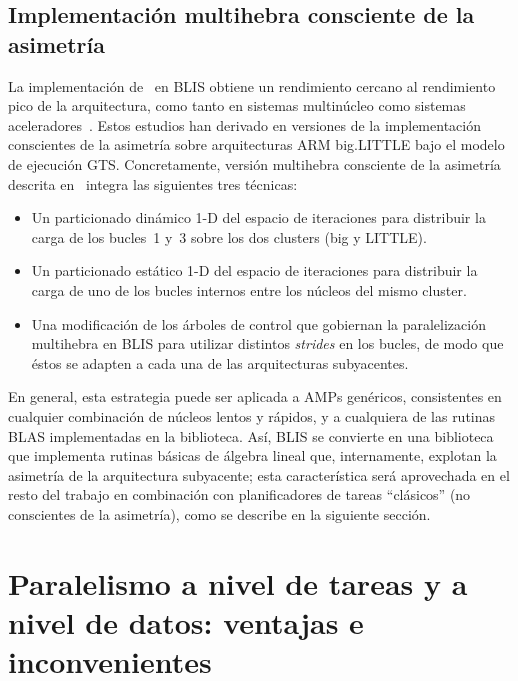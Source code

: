 

\subsection{Implementación multihebra consciente de la asimetría}

La implementación de \gemm\ en BLIS obtiene un rendimiento cercano al rendimiento pico de la arquitectura,
como tanto en sistemas multinúcleo como sistemas aceleradores~\cite{BLIS2,BLIS3}. 
Estos estudios han derivado en versiones de la implementación conscientes de la asimetría sobre arquitecturas ARM big.LITTLE
bajo el modelo de ejecución GTS. Concretamente, versión multihebra consciente de la asimetría descrita en~\cite{asymBLIS} 
integra las siguientes tres técnicas:
\begin{itemize}
\item Un particionado dinámico 1-D del espacio de iteraciones para distribuir la carga de los bucles~1 y~3 sobre los dos
	clusters (big y LITTLE).
\item Un particionado estático 1-D del espacio de iteraciones para distribuir la carga de uno de los  bucles internos entre los núcleos
	del mismo cluster.
\item Una modificación de los árboles de control que gobiernan la paralelización multihebra en BLIS para utilizar distintos {\em strides} en 
	los bucles, de modo que éstos se adapten a cada una de las arquitecturas subyacentes.
\end{itemize}

En general, esta estrategia puede ser aplicada a AMPs genéricos, consistentes en cualquier combinación de núcleos lentos y rápidos, y a cualquiera
de las rutinas BLAS implementadas en la biblioteca. Así, BLIS se convierte en una biblioteca que implementa rutinas básicas de álgebra lineal que,
internamente, explotan la asimetría de la arquitectura subyacente; esta característica será aprovechada en el resto del trabajo en combinación
con planificadores de tareas ``clásicos'' (no conscientes de la asimetría), como se describe en la siguiente sección.


\section{Paralelismo a nivel de tareas y a nivel de datos: ventajas e inconvenientes}
\label{sec:comparativa}


